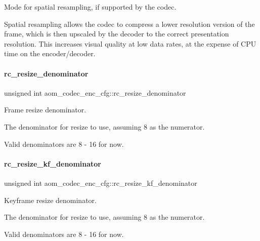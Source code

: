 Mode for spatial resampling, if supported by the codec. 

Spatial resampling allows the codec to compress a lower resolution version of the frame, which is then upscaled by the decoder to the correct presentation resolution. This increases visual quality at low data rates, at the expense of C\+PU time on the encoder/decoder. \mbox{\label{structaom__codec__enc__cfg_a0e1d616495fb994ed67418b90b14f168}} 
\paragraph{\texorpdfstring{rc\+\_\+resize\+\_\+denominator}{rc\_resize\_denominator}}
{\footnotesize\ttfamily unsigned int aom\+\_\+codec\+\_\+enc\+\_\+cfg\+::rc\+\_\+resize\+\_\+denominator}



Frame resize denominator. 

The denominator for resize to use, assuming 8 as the numerator.

Valid denominators are 8 -\/ 16 for now. \mbox{\label{structaom__codec__enc__cfg_a5da400d15cfd927a18e17a44985b910a}} 
\paragraph{\texorpdfstring{rc\+\_\+resize\+\_\+kf\+\_\+denominator}{rc\_resize\_kf\_denominator}}
{\footnotesize\ttfamily unsigned int aom\+\_\+codec\+\_\+enc\+\_\+cfg\+::rc\+\_\+resize\+\_\+kf\+\_\+denominator}



Keyframe resize denominator. 

The denominator for resize to use, assuming 8 as the numerator.

Valid denominators are 8 -\/ 16 for now. \mbox{\label{structaom__codec__enc__cfg_a704ff1b4202b1d5499928b98eef17424}} 
